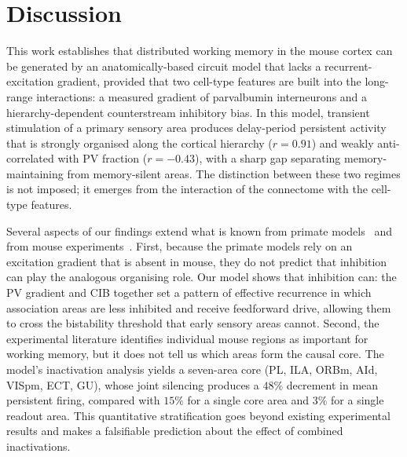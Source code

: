 \documentclass[11pt]{article}
\begin{document}
\section{Discussion}\label{sec:discussion}

This work establishes that distributed working memory in the mouse cortex can be generated by an anatomically-based circuit model that lacks a recurrent-excitation gradient, provided that two cell-type features are built into the long-range interactions: a measured gradient of parvalbumin interneurons and a hierarchy-dependent counterstream inhibitory bias. In this model, transient stimulation of a primary sensory area produces delay-period persistent activity that is strongly organised along the cortical hierarchy ($r=0.91$) and weakly anti-correlated with PV fraction ($r=-0.43$), with a sharp gap separating memory-maintaining from memory-silent areas. The distinction between these two regimes is not imposed; it emerges from the interaction of the connectome with the cell-type features.

Several aspects of our findings extend what is known from primate models~\cite{murray2014hierarchy,mejias2022mechanisms,froudistwalsh2021dopamine} and from mouse experiments~\cite{guo2017maintenance,inagaki2019discrete,bolkan2017thalamic,schmitt2017thalamic,gilad2018behavioral}. First, because the primate models rely on an excitation gradient that is absent in mouse, they do not predict that inhibition can play the analogous organising role. Our model shows that inhibition can: the PV gradient and CIB together set a pattern of effective recurrence in which association areas are less inhibited and receive feedforward drive, allowing them to cross the bistability threshold that early sensory areas cannot. Second, the experimental literature identifies individual mouse regions as important for working memory, but it does not tell us which areas form the causal core. The model's inactivation analysis yields a seven-area core (PL, ILA, ORBm, AId, VISpm, ECT, GU), whose joint silencing produces a $48\%$ decrement in mean persistent firing, compared with $15\%$ for a single core area and $3\%$ for a single readout area. This quantitative stratification goes beyond existing experimental results and makes a falsifiable prediction about the effect of combined inactivations.
\end{document}
